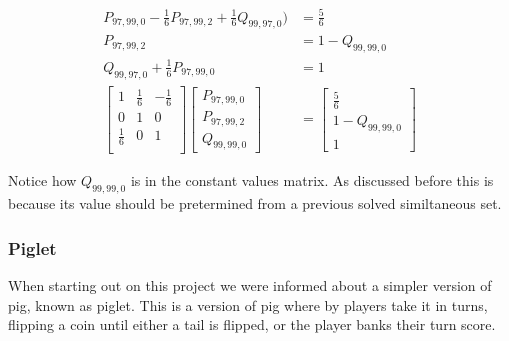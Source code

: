\documentclass[a4paper,titlepage]{article}
\begin{document}
\begin{align*}
	P_{97,99,0} - \frac{1}{6}P_{97,99,2} + \frac{1}{6}Q_{99,97,0}) &= \frac{5}{6}\\
	P_{97,99,2}                                                    &= 1 - Q_{99,99,0}\\
	Q_{99,97,0} + \frac{1}{6}P_{97,99,0}                           &= 1\\
	\begin{bmatrix}
		1           & \frac{1}{6} & -\frac{1}{6}\\
		0           & 1           & 0\\
		\frac{1}{6} & 0           & 1\\
	\end{bmatrix}
	\begin{bmatrix}
		P_{97,99,0}\\
		P_{97,99,2}\\
		Q_{99,99,0}
	\end{bmatrix}
	& =
	\begin{bmatrix}
		\frac{5}{6}\\
		1 - Q_{99,99,0}\\
		1
	\end{bmatrix}
\end{align*}

Notice how $Q_{99,99,0}$ is in the constant values matrix. As discussed before this is because its value should be pretermined from a previous solved similtaneous set.



\subsubsection{Piglet}
When starting out on this project we were informed about a simpler version of pig, known as piglet. This is a version of pig
where by players take it in turns, flipping a coin until either a tail is flipped, or the player banks their turn score.
\end{document}

